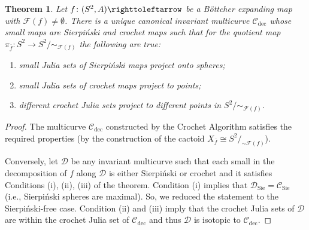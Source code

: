 \documentclass{amsart}
\theoremstyle{plain}
\newtheorem{theorem}{Theorem}[section]
\theoremstyle{definition}
\theoremstyle{remark}
\newcommand{\reminder}[1]{\textsl{$\lhd\rhd$#1$\lhd\rhd$}\marginpar{$\lhd\rhd\lhd\rhd\lhd\rhd$}}%
\newcommand{\hide}[1]{}
\newcommand{\Fat}{{\mathcal F}}
\newcommand{\CC}{{\mathcal C}}
\newcommand{\DD}{{\mathcal D}}
\newcommand{\NL}{{\mathfrak N}}
\newcommand\selfmap{\righttoleftarrow}
\newcommand{\cro}{{\operatorname{dec}}}
\newcommand{\Sie}{{\operatorname{Sie}}}
\begin{document}
\begin{theorem}
\label{thm:cro decomp can}
Let $f\colon(S^2,A)\selfmap$ be a B\"ottcher expanding map with $\Fat(f)\not=\emptyset$.  There is a unique canonical invariant multicurve $\CC_\cro$ whose small maps are Sierpi\'{n}ski and crochet maps such that for the quotient map $\pi_{\overline{f}}\colon S^2\to S^2/{\sim_{\Fat(f)}}$ the following are true:
\begin{enumerate}[label=\text{(\roman*)},font=\normalfont,leftmargin=*]
\item  small Julia sets of Sierpi\'{n}ski maps project onto spheres;
\item small Julia sets of crochet maps project to points;
\item  different crochet Julia sets project to different points in $S^2/{\sim_{\Fat(f)}}$.
\end{enumerate}
\end{theorem}  

\begin{proof}%
The multicurve $\CC_\cro$ constructed by the Crochet Algorithm satisfies the required properties (by the construction of the cactoid $X_{\bar f}\cong S^2/_{\sim\Fat(f)}$). 

Conversely, let $\DD$ be any invariant multicurve such that each small in the decomposition of $f$ along $\DD$ is either Sierpi\'{n}ski or crochet and it satisfies Conditions (i), (ii), (iii) of the theorem. Condition (i) implies that $\DD_\Sie = \CC_\Sie$ (i.e., Sierpi\'{n}ski spheres are maximal). So, we reduced the statement to the Sierpi\'{n}ski-free case. Condition (ii) and (iii) imply that the crochet Julia sets of $\DD$ are within the crochet Julia set of $\CC_\cro$ and thus $\DD$ is isotopic to $\CC_\cro$.
\end{proof}













\end{document}
